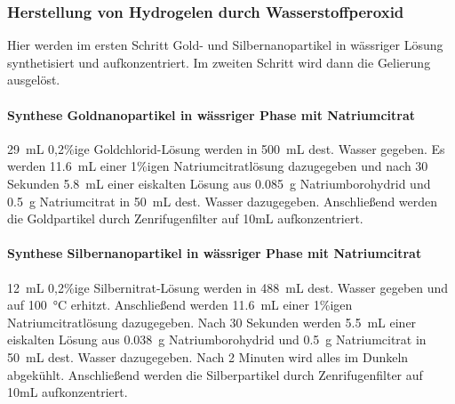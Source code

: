 		\subsubsection{Herstellung von Hydrogelen durch Wasserstoffperoxid}
			Hier werden im ersten Schritt Gold- und Silbernanopartikel in wässriger Lösung synthetisiert und aufkonzentriert.
			Im zweiten Schritt wird dann die Gelierung ausgelöst. \autocite{Bigall2009} 
		 
			\paragraph{Synthese Goldnanopartikel in wässriger Phase mit Natriumcitrat}
			
			\SI{29}{\milli\liter} 0,2\%ige Goldchlorid-Lösung werden in \SI{500}{\milli\liter} dest. Wasser gegeben.
			Es werden \SI{11,6}{\milli\liter} einer 1\%igen Natriumcitratlösung dazugegeben und nach 30 Sekunden \SI{5,8}{\milli\liter}	einer eiskalten Lösung aus \SI{0,085}{\gram} Natriumborohydrid und \SI{0,5}{\gram} Natriumcitrat in \SI{50}{\milli\liter} dest. Wasser dazugegeben.
			Anschließend werden die Goldpartikel durch Zenrifugenfilter auf 10mL aufkonzentriert.
			
			\paragraph{Synthese Silbernanopartikel in wässriger Phase mit Natriumcitrat}
			
			\SI{12}{\milli\liter} 0,2\%ige Silbernitrat-Lösung werden in \SI{488}{\milli\liter} dest. Wasser gegeben und auf \SI{100}{\degreeCelsius} erhitzt.
			Anschließend werden \SI{11,6}{\milli\liter} einer 1\%igen Natriumcitratlösung dazugegeben.
			Nach 30 Sekunden werden  \SI{5,5}{\milli\liter}	einer eiskalten Lösung aus \SI{0,038}{\gram} Natriumborohydrid und \SI{0,5}{\gram} Natriumcitrat in \SI{50}{\milli\liter} dest. Wasser dazugegeben.
			Nach 2 Minuten wird alles im Dunkeln abgekühlt.
			Anschließend werden die Silberpartikel durch Zenrifugenfilter auf 10mL aufkonzentriert.
			
